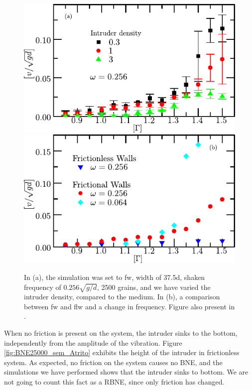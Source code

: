 \begin{figure}[H]
    \centering
    \includegraphics[width=0.65\linewidth]{04-figuras/BNE_FW_Density.pdf} \\
    \includegraphics[width=0.65\linewidth]{04-figuras/BNE_W.pdf}
    \caption[BNE with frictional walls: Ascent rate versus $\Gamma$.]{In (a), the simulation was set to fw, width of 37.5d, shaken frequency of $0.256\sqrt{g/d}$, 2500 grains, and we have varied the intruder density, compared to the medium. In (b), a comparison between fw and flw and a change in frequency. Figure also present in \cite{Large-deviation_quantification_of_boundary_conditions_on_the_Brazil_nut_effect}.}
    \label{fig:BNE_walls}
\end{figure}

    When no friction is present on the system, the intruder sinks to the bottom, independently from the amplitude of the vibration. Figure \ref{fig:BNE25000_sem_Atrito} exhibits the height of the intruder in frictionless system. As expected, no friction on the system causes no BNE, and the simulations we have performed shows that the intruder sinks to bottom. We are not going to count this fact as a RBNE, since only friction has changed.

